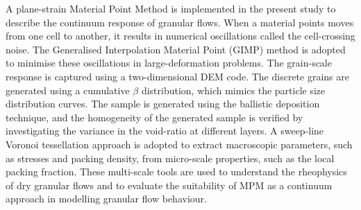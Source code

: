 A plane-strain Material Point Method is implemented in the present study to 
describe the continuum response of granular flows. When a material points 
moves from one cell to another, it results in numerical oscillations called 
the cell-crossing noise. The Generalised Interpolation Material Point (GIMP) 
method is adopted to minimise these oscillations in large-deformation problems. 
The grain-scale response is captured using a two-dimensional 
DEM code. The discrete grains are generated using a cumulative $\beta$ 
distribution, which mimics the particle size distribution curves. The sample is 
generated using the ballistic deposition technique, and the homogeneity of the 
generated sample is verified by investigating the variance in the void-ratio at 
different layers. A sweep-line Voronoi tessellation approach is adopted to 
extract macroscopic parameters, such as stresses and packing density, from 
micro-scale properties, such as the local packing fraction. These multi-scale 
tools are used to understand the rheophysics of dry granular flows and to 
evaluate the suitability of MPM as a continuum approach in modelling granular 
flow behaviour.
